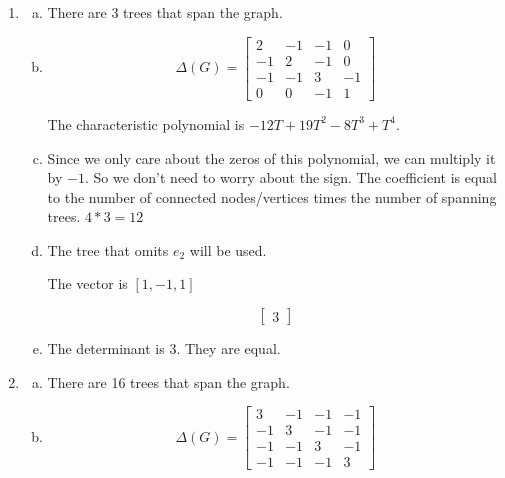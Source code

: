 \documentclass[12pt]{article}
\begin{document}
\section{} %
\begin{enumerate}[(G1)]
	\item 
		\begin{enumerate}[(a)]
			\item There are 3 trees that span the graph.
			
			\item 
				\[\Delta(G) = 
				\begin{bmatrix}
					2 & -1 & -1 & 0\\
					-1 & 2 & -1 & 0\\
					-1 & -1 & 3 & -1\\
					0 & 0 & -1 & 1
				\end{bmatrix}
				\]
				
				The characteristic polynomial is $ -12T + 19T^2 - 8T^3 + T^4 $.
				
			\item Since we only care about the zeros of this polynomial, we can multiply it by $ -1 $. So we don't need to worry about the sign. The coefficient is equal to the number of connected nodes/vertices times the number of spanning trees. $ 4 * 3 = 12 $
			
			\item The tree that omits $ e_2 $ will be used.
			
			The vector is $ [1,-1,1] $
			
			\[ \begin{bmatrix}
				3
			\end{bmatrix} \]
				
			\item The determinant is 3. They are equal.
		\end{enumerate}
	
	\item 
		\begin{enumerate}[(a)]
			\item There are 16 trees that span the graph.
			
			\item 
				\[\Delta(G) = 
				\begin{bmatrix}
					3 & -1 & -1 & -1\\
					-1 & 3 & -1 & -1\\
					-1 & -1 & 3 & -1\\
					-1 & -1 & -1 & 3
				\end{bmatrix}
				\]
			

\end{enumerate}
\end{enumerate}
\end{document}
